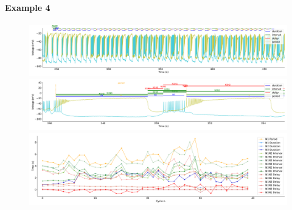 \paragraph{\large{Example 4}}

\begin{figure}[htbp]
	\centering
	\begin{minipage}[b]{\textwidth}
		\centering				\includegraphics[width=\textwidth,height=0.1\textheight]{./invariants/data/SUSSEX/CV1a_driven4/images/stim_cv1a4_3phases_signal_intervals_zoom.pdf}
		\includegraphics[width=\textwidth]{./invariants/data/SUSSEX/CV1a_driven4/images/stim_cv1a4_3phases_signal_intervals_cycle.pdf}
		\includegraphics[width=\textwidth]{./invariants/data/SUSSEX/CV1a_driven4/images/stim_cv1a4_3phases_time_cycle.pdf}
	\end{minipage}
	\centering
	\begin{minipage}[b]{0.45\textwidth}
		\centering

\end{minipage}
\end{figure}
